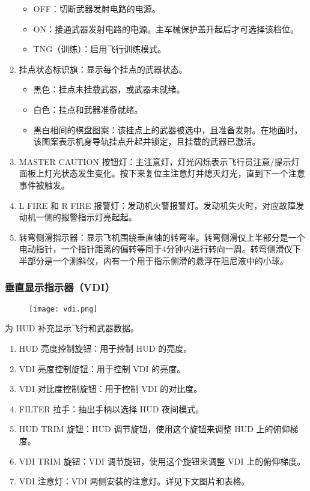 \begin{enumerate}
\begin{itemize}
    \item OFF：切断武器发射电路的电源。
    \item ON：接通武器发射电路的电源。主军械保护盖升起后才可选择该档位。
    \item TNG（训练）：启用飞行训练模式。
  \end{itemize}
  \item 挂点状态标识旗：显示每个挂点的武器状态。
  \begin{itemize}
    \item 黑色：挂点未挂载武器，或武器未就绪。
    \item 白色：挂点和武器准备就绪。
    \item 黑白相间的棋盘图案：该挂点上的武器被选中，且准备发射。在地面时，该图案表示机身导轨挂点升起并锁定，且挂载的武器已激活。
  \end{itemize}
  \item MASTER CAUTION 按钮灯：主注意灯，灯光闪烁表示飞行员注意/提示灯面板上灯光状态发生变化。按下来复位主注意灯并熄灭灯光，直到下一个注意事件被触发。
  \item L FIRE 和 R FIRE 报警灯：发动机火警报警灯。发动机失火时，对应故障发动机一侧的报警指示灯亮起起。
  \item 转弯侧滑指示器：显示飞机围绕垂直轴的转弯率。转弯侧滑仪上半部分是一个电动指针，一个指针距离的偏转等同于4分钟内进行转向一周。转弯侧滑仪下半部分是一个测斜仪，内有一个用于指示侧滑的悬浮在阻尼液中的小球。
\end{enumerate}

\subsubsection{垂直显示指示器（VDI）}

\begin{figure}[htb]
  \center
  \texttt{[image: vdi.png]}
\end{figure}
为 HUD 补充显示飞行和武器数据。

\begin{enumerate}
  \item HUD 亮度控制旋钮：用于控制 HUD 的亮度。
  \item VDI 亮度控制旋钮：用于控制 VDI 的亮度。
  \item VDI 对比度控制旋钮：用于控制 VDI 的对比度。
  \item FILTER 拉手：抽出手柄以选择 HUD 夜间模式。
  \item HUD TRIM 旋钮：HUD 调节旋钮，使用这个旋钮来调整 HUD 上的俯仰梯度。
  \item VDI TRIM 旋钮：VDI 调节旋钮，使用这个旋钮来调整 VDI 上的俯仰梯度。
  \item VDI 注意灯：VDI 两侧安装的注意灯。详见下文图片和表格。
\end{enumerate}

